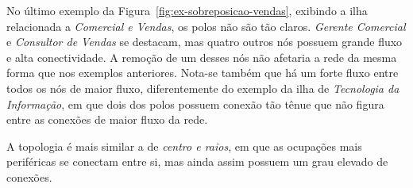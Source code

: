 \documentclass[
  article,
  11pt,
  a4paper,
  english,
  brazil,
  sumario=tradicional]{abntex2}
\begin{document}

No último exemplo da Figura~\ref{fig:ex-sobreposicao-vendas}, exibindo a ilha relacionada a \textit{Comercial e Vendas}, os polos não são tão claros. \textit{Gerente Comercial} e \textit{Consultor de Vendas} se destacam, mas quatro outros nós possuem grande fluxo e alta conectividade. A remoção de um desses nós não afetaria a rede da mesma forma que nos exemplos anteriores. Nota-se também que há um forte fluxo entre todos os nós de maior fluxo, diferentemente do exemplo da ilha de \textit{Tecnologia da Informação}, em que dois dos polos possuem conexão tão tênue que não figura entre as conexões de maior fluxo da rede.

A topologia é mais similar a de \textit{centro e raios}, em que as ocupações mais periféricas se conectam entre si, mas ainda assim possuem um grau elevado de conexões.
\end{document}
